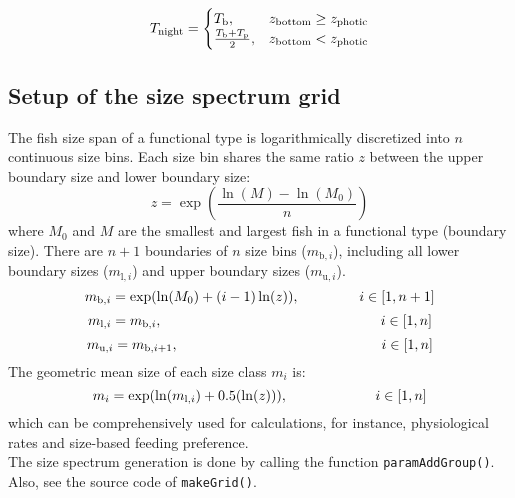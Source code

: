 \documentclass[
]{article}
\begin{document}
\begin{equation}
 T_{\mathrm{night}} =
  \begin{cases}
     T_{\mathrm{b}}, & \text{$ z_{\mathrm{bottom}} \geq z_{\mathrm{photic}} $}  \\
     \frac{T_{\mathrm{b}}+T_{\mathrm{p}}}{2}, & \text{$ z_{\mathrm{bottom}} < z_{\mathrm{photic}} $} 
  \end{cases}
\label{eq:xxxxxx3}
\end{equation}

\hypertarget{setup-of-the-size-spectrum-grid}{%
\subsection{Setup of the size spectrum
grid}\label{setup-of-the-size-spectrum-grid}}

The fish size span of a functional type is logarithmically discretized
into \(n\) continuous size bins. Each size bin shares the same ratio
\(z\) between the upper boundary size and lower boundary size:
\begin{equation}
z = \exp \left( \frac{\ln (M) - \ln (M_{0})}{n} \right)
\end{equation} where \(M_{0}\) and \(M\) are the smallest and largest
fish in a functional type (boundary size). There are \(n+1\) boundaries
of \(n\) size bins (\(m_{\mathrm{b},i}\)), including all lower boundary
sizes (\(m_{\mathrm{l},i}\)) and upper boundary sizes
(\(m_{\mathrm{u},i}\)). \begin{equation}
m_{\mathrm{b},i} =  \exp( \ln(M_{0}) + (i-1) \ln(z)), \hspace{1.5cm}  i\in[1,n+1]
\end{equation} \begin{equation}
m_{\mathrm{l},i} =  m_{\mathrm{b},i}, \hspace{5.5cm}  i\in[1,n]
\end{equation} \begin{equation}
m_{\mathrm{u},i} =  m_{\mathrm{b},i+1}, \hspace{5.1cm}  i\in[1,n]
\end{equation} The geometric mean size of each size class \(m_{i}\) is:
\begin{equation}
m_{i} =  \exp ( \ln(m_{\mathrm{l},i}) + 0.5(\ln(z)) ), \hspace{2.2cm}  i\in[1,n]
\end{equation} which can be comprehensively used for calculations, for
instance, physiological rates and size-based feeding preference.\\
The size spectrum generation is done by calling the function
\texttt{paramAddGroup()}. Also, see the source code of
\texttt{makeGrid()}.
\end{document}
